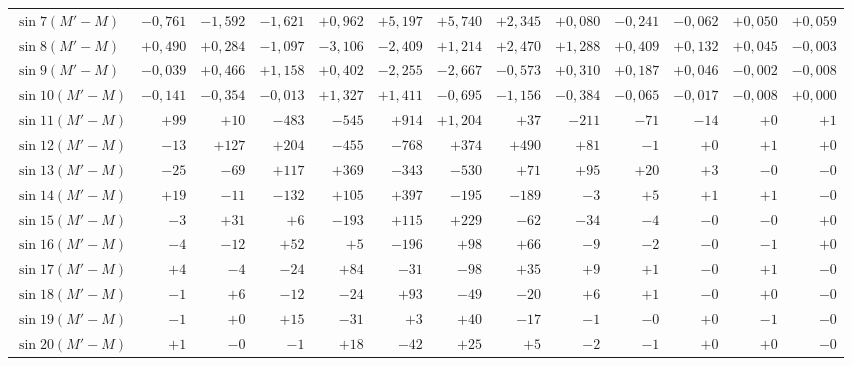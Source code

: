 \begin{landscape}
\begin{longtable}{@{}l|r|r|r|r|r|r|r|r|r|r|r|r@{}}
\(\sin 7(M'-M)\) & \(-0{,}761\) & \(-1{,}592\) & \(-1{,}621\) & \(+0{,}962\) & \(+5{,}197\) & \(+5{,}740\) & \(+2{,}345\) & \(+0{,}080\) & \(-0{,}241\) & \(-0{,}062\) & \(+0{,}050\) & \(+0{,}059\)\\
\(\sin 8(M'-M)\) & \(+0{,}490\) & \(+0{,}284\) & \(-1{,}097\) & \(-3{,}106\) & \(-2{,}409\) & \(+1{,}214\) & \(+2{,}470\) & \(+1{,}288\) & \(+0{,}409\) & \(+0{,}132\) & \(+0{,}045\) & \(-0{,}003\)\\
\(\sin 9(M'-M)\) & \(-0{,}039\) & \(+0{,}466\) & \(+1{,}158\) & \(+0{,}402\) & \(-2{,}255\) & \(-2{,}667\) & \(-0{,}573\) & \(+0{,}310\) & \(+0{,}187\) & \(+0{,}046\) & \(-0{,}002\) & \(-0{,}008\)\\
\(\sin 10(M'-M)\) & \(-0{,}141\) & \(-0{,}354\) & \(-0{,}013\) & \(+1{,}327\) & \(+1{,}411\) & \(-0{,}695\) & \(-1{,}156\) & \(-0{,}384\) & \(-0{,}065\) & \(-0{,}017\) & \(-0{,}008\) & \(+0{,}000\)\\
\(\sin 11(M'-M)\) & \(+99\) & \(+10\) & \(-483\) & \(-545\) & \(+914\) & \(+1{,}204\) & \(+37\) & \(-211\) & \(-71\) & \(-14\) & \(+0\) & \(+1\)\\
\(\sin 12(M'-M)\) & \(-13\) & \(+127\) & \(+204\) & \(-455\) & \(-768\) & \(+374\) & \(+490\) & \(+81\) & \(-1\) & \(+0\) & \(+1\) & \(+0\)\\
\(\sin 13(M'-M)\) & \(-25\) & \(-69\) & \(+117\) & \(+369\) & \(-343\) & \(-530\) & \(+71\) & \(+95\) & \(+20\) & \(+3\) & \(-0\) & \(-0\)\\
\(\sin 14(M'-M)\) & \(+19\) & \(-11\) & \(-132\) & \(+105\) & \(+397\) & \(-195\) & \(-189\) & \(-3\) & \(+5\) & \(+1\) & \(+1\) & \(-0\)\\
\(\sin 15(M'-M)\) & \(-3\) & \(+31\) & \(+6\) & \(-193\) & \(+115\) & \(+229\) & \(-62\) & \(-34\) & \(-4\) & \(-0\) & \(-0\) & \(+0\)\\
\(\sin 16(M'-M)\) & \(-4\) & \(-12\) & \(+52\) & \(+5\) & \(-196\) & \(+98\) & \(+66\) & \(-9\) & \(-2\) & \(-0\) & \(-1\) & \(+0\)\\
\(\sin 17(M'-M)\) & \(+4\) & \(-4\) & \(-24\) & \(+84\) & \(-31\) & \(-98\) & \(+35\) & \(+9\) & \(+1\) & \(-0\) & \(+1\) & \(-0\)\\
\(\sin 18(M'-M)\) & \(-1\) & \(+6\) & \(-12\) & \(-24\) & \(+93\) & \(-49\) & \(-20\) & \(+6\) & \(+1\) & \(-0\) & \(+0\) & \(-0\)\\
\(\sin 19(M'-M)\) & \(-1\) & \(+0\) & \(+15\) & \(-31\) & \(+3\) & \(+40\) & \(-17\) & \(-1\) & \(-0\) & \(+0\) & \(-1\) & \(-0\)\\
\(\sin 20(M'-M)\) & \(+1\) & \(-0\) & \(-1\) & \(+18\) & \(-42\) & \(+25\) & \(+5\) & \(-2\) & \(-1\) & \(+0\) & \(+0\) & \(-0\)\\

\end{longtable}
\end{landscape}
